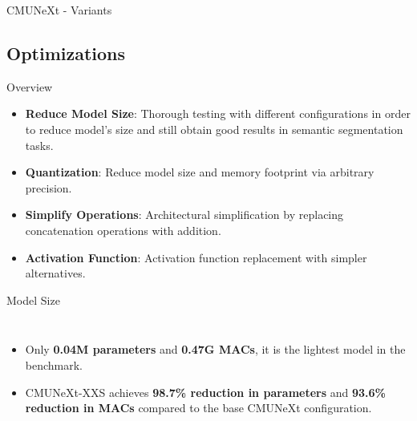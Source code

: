 \documentclass[aspectratio=169,xcolor=dvipsnames]{beamer}
\newcommand{\itemvtab}{\setlength{\itemsep}{0.3cm}}
\begin{document}
\begin{frame}{CMUNeXt - Variants}
    \begin{table}[t]
        \footnotesize
        \fittowidth{}
        \caption{CMUNeXt Configuration Variants}
    \end{table}
\end{frame}


\subsection{Optimizations}


\begin{frame}{Overview}
    \begin{itemize}
        \itemvtab
        \item \textbf{Reduce Model Size}: Thorough testing with different configurations in order to reduce model's size and still obtain good results in semantic segmentation tasks.
        \item \textbf{Quantization}: Reduce model size and memory footprint via arbitrary precision.
        \item \textbf{Simplify Operations}: Architectural simplification by replacing concatenation operations with addition.
        \item \textbf{Activation Function}: Activation function replacement with simpler alternatives.
    \end{itemize}
\end{frame}



\begin{frame}[allowframebreaks]{Model Size}
    \begin{table}[t]
        \fittowidth{}
        \caption{CMUNeXt Configuration Variants and Custom Configuration}
    \end{table}

    \framebreak
    \begin{columns}
        \begin{itemize}
            \itemvtab
            \item Only \textbf{0.04M parameters} and \textbf{0.47G MACs}, it is the lightest model in the benchmark.
            \item CMUNeXt-XXS achieves \textbf{98.7\% reduction in parameters} and \textbf{93.6\% reduction in MACs} compared to the base CMUNeXt configuration.
        \end{itemize}  
        \begin{table}[t]
            \fittowidth{}
        \caption{Model Size Comparison}
    \end{table}
    \end{columns}
    
\end{frame}
\end{document}
